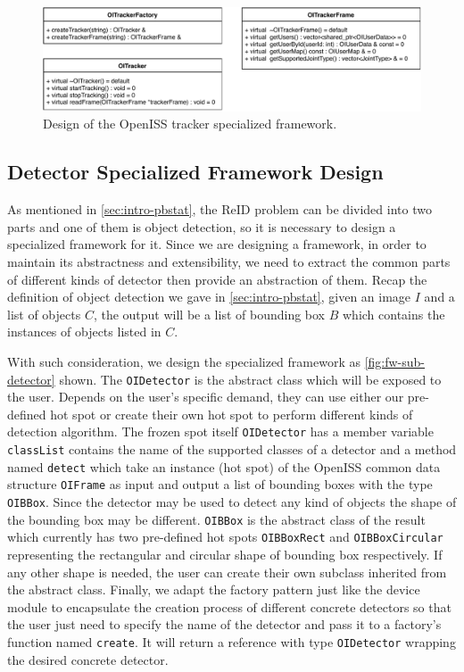 \begin{figure}
    \centering
    \includegraphics[width=\linewidth]{figures/framework_sub_tracker.pdf}
    \caption{Design of the OpenISS tracker specialized framework.}
    \label{fig:fw-sub-tracker}
\end{figure}

\subsection{Detector Specialized Framework Design}
\label{sec:fw-design-spec-detector}

As mentioned in \autoref{sec:intro-pbstat}, the ReID problem 
can be divided into two parts and one of them is object detection, so it is 
necessary to design a specialized framework for it. Since
we are designing a framework, in order to maintain its abstractness and
extensibility, we need to extract the common parts of different kinds of
detector then provide an abstraction of them.
Recap the definition of object detection we gave in \autoref{sec:intro-pbstat},
given an image $I$ and a list of objects $C$, the output will be a list of
bounding box $B$ which contains the instances of objects listed in $C$.

With such consideration, we design the specialized framework as
\autoref{fig:fw-sub-detector} shown. The \texttt{OIDetector} is the abstract
class which will be exposed to the user. Depends on the user's specific demand,
they can use either our pre-defined hot spot or create their own hot spot to
perform different kinds of detection algorithm. The frozen spot itself
\texttt{OIDetector} has a member variable \texttt{classList} contains the name
of the supported classes of a detector and a method named \texttt{detect} which
take an instance (hot spot) of the OpenISS common data structure
\texttt{OIFrame} as input and output a list of bounding boxes with the type
\texttt{OIBBox}.
Since the detector may be used to detect any kind of objects the shape of the
bounding box may be different. \texttt{OIBBox} is the abstract class of the
result which currently has two pre-defined hot spots \texttt{OIBBoxRect} and
\texttt{OIBBoxCircular} representing the rectangular and circular shape of
bounding box respectively. If any other shape is needed, the user can create
their own subclass inherited from the abstract class.
Finally, we adapt the factory pattern just like the device module to
encapsulate the creation process of different concrete detectors so that
the user just need to specify the name of the detector and pass it to a
factory's function named \texttt{create}. It will return a reference with type
\texttt{OIDetector} wrapping the desired concrete detector.

